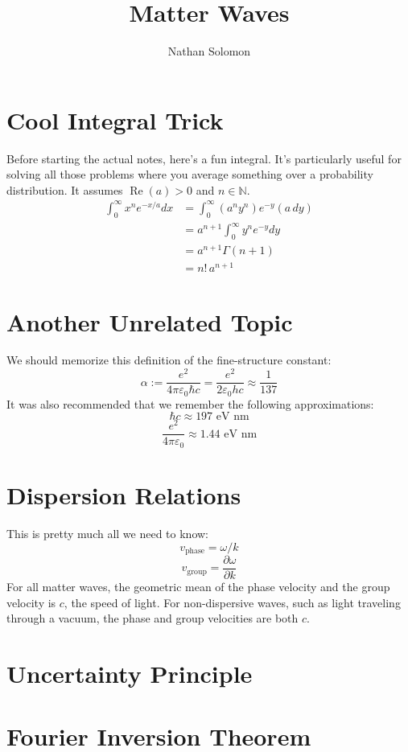 \documentclass[12pt]{article}
\begin{document}
\title{Matter Waves}
\author{Nathan Solomon}
\maketitle

\section{Cool Integral Trick}
Before starting the actual notes, here's a fun integral. It's particularly useful for solving all those problems where you average something over a probability distribution. It assumes $\operatorname{Re}(a)>0$ and $n \in \mathbb{N}$.
\begin{align*}
    \int_0^\infty x^n e^{-x/a} dx &= \int_0^\infty (a^n y^n) e^{-y} (a \, dy) \\
    &= a^{n+1} \int_0^\infty y^n e^{-y} dy \\
    &= a^{n+1} \Gamma(n+1) \\
    &= n! \, a^{n+1}
\end{align*}

\section{Another Unrelated Topic}
We should memorize this definition of the fine-structure constant:
\[ \alpha := \frac{e^2}{4 \pi \varepsilon_0 \hbar c} = \frac{e^2}{2 \varepsilon_0 h c} \approx \frac{1}{137} \]
It was also recommended that we remember the following approximations:
\[ \hbar c \approx 197 \text{ eV nm} \]
\[ \frac{e^2}{4 \pi \varepsilon_0} \approx 1.44 \text{ eV nm} \]

\section{Dispersion Relations}
This is pretty much all we need to know:
\[ v_\text{phase} = \omega / k \]
\[ v_\text{group} = \frac{\partial \omega}{\partial k} \]
For all matter waves, the geometric mean of the phase velocity and the group velocity is $c$, the speed of light. For non-dispersive waves, such as light traveling through a vacuum, the phase and group velocities are both $c$.

\section{Uncertainty Principle}

\section{Fourier Inversion Theorem}
\end{document}
